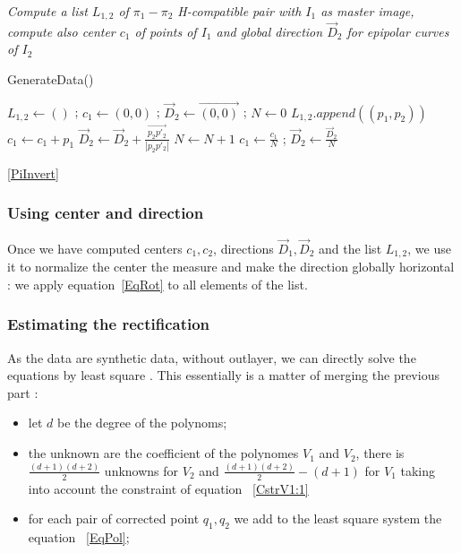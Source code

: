 \documentclass[a4paper]{article}
\newcommand{\PiVert}{\widetilde{\pi}}
\begin{document}
\begin{algorithm}
\emph{Compute a list $L_{1,2}$  of   $\pi_1-\pi_2$ H-compatible pair with $I_1$ as master image,
  compute also center $c_1$ of points of $I_1$  and global direction $\vec{D}_2$ for epipolar curves of $I_2$}
\caption{GenerateData()}
\begin{algorithmic}
    \STATE $L_{1,2}\gets () $ ;  $c_1 \gets (0,0)$  ;   $\vec{D}_2 \gets  \overrightarrow{(0,0)}$ ; $N \gets 0 $
                  \STATE {$p_2 = \pi_2(\PiVert^{-1}_1(p_1,Z))$}
                  \STATE {$p'_2 = \pi_2(\PiVert^{-1}_1(p_1,Z+\delta_{z}))$}
                       \STATE $L_{1,2}.append((p_1,p_2))$  
                       \STATE $c_1 \gets c_1 + p_1$
                       \STATE $\vec{D}_2 \gets  \vec{D}_2 + \frac{\overrightarrow{p_2 p'_2}}{|p_2 p'_2|}$
                       \STATE $N \gets  N +1 $
                  \ENDIF
             \ENDFOR
        \ENDFOR
    \ENDFOR
    $c_1 \gets \frac{c_1}{N}$  ; $\vec{D}_2 \gets \frac{\vec{D}_2}{N} $
\end{algorithmic}
\label{AlgoGenData}
\end{algorithm}

\ref{PiInvert}


\subsubsection{Using center and direction}

Once we have computed centers $c_1,c_2$, directions   $\vec{D}_1,\vec{D}_2$  and the list $L_{1,2}$,
we use it  to normalize the center the measure and make the direction globally
horizontal : we apply equation~\ref{EqRot}  to all elements of the list.


\subsubsection{Estimating the rectification}

As the data are synthetic data, without outlayer, we can directly solve
the equations by least square . This essentially is
a matter of merging the previous part :

\begin{itemize}
    \item let $d$ be the degree of the polynoms;
    \item the unknown are the coefficient of the polynomes $V_1$ and $V_2$, there is
          $\frac{(d+1)(d+2)}{2}$ unknowns for $V_2$ and $\frac{(d+1)(d+2)}{2}-(d+1) $  for $V_1$
          taking into account the  constraint of equation ~\ref{CstrV1:1}
     \item for each pair of corrected point $q_1,q_2$ we add to the least square system
          the equation ~\ref{EqPol};
\end{itemize}
\end{document}

